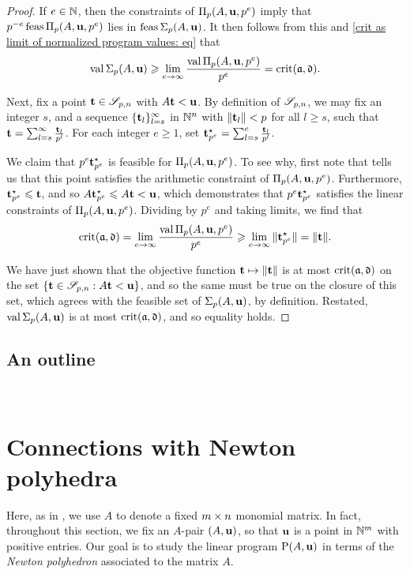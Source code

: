 \documentclass[11pt]{amsart}
\begin{document}
\begin{proof}
   If $e \in \mathbb{N}$, then the constraints of $\Pi_p(A, \mathbf{u}, p^e)$ imply that $p^{-e}  \operatorname{feas} \Pi_p(A, \mathbf{u}, p^e)$ lies in $\operatorname{feas} \Sigma_p(A,\mathbf{u})$.
   It then follows from this and \eqref{crit as limit of normalized program values: eq} that
   \[
      \operatorname{val}\Sigma_p(A,\mathbf{u}) \geqslant \displaystyle \lim_{e \to \infty}\frac{\operatorname{val}\Pi_p(A,\mathbf{u}, p^e)}{p^e} = \operatorname{crit}(\mathfrak{a}, \mathfrak{d}).
   \]

   Next, fix a point $\mathbf{t} \in \mathscr{S}_{p,n}$ with $A \mathbf{t} < \mathbf{u}$.
   By definition of $\mathscr{S}_{p,n}$, we may fix an integer $s$, and a sequence $\{ \mathbf{t}_l \}_{l=s}^\infty$ in $\mathbb{N}^n$ with $\| \mathbf{t}_l \| < p$ for all $l \geq s$, such that $\mathbf{t} = \sum_{l=s}^{\infty} \frac{\mathbf{t}_l}{p^l}$.
   For each integer $e \geq 1$, set $\mathbf{t}^\star_{p^e} = \sum_{l=s}^{e} \frac{\mathbf{t}_l}{p^l}$.

   We claim that $p^e  \mathbf{t}^\star_{p^e}$ is feasible for $\Pi_p(A, \mathbf{u}, p^e)$.
   To see why, first note that  tells us that this point satisfies the arithmetic constraint of $\Pi_p(A, \mathbf{u}, p^e)$.
   Furthermore, $\mathbf{t}^{\star}_{p^e} \leqslant \mathbf{t}$, and so $A \mathbf{t}^{\star}_{p^e} \leqslant A \mathbf{t} < \mathbf{u}$, which demonstrates that $p^e \mathbf{t}^\star_{p^e}$ satisfies the linear constraints of $\Pi_p(A, \mathbf{u}, p^e)$.
   Dividing by $p^e$ and taking limits, we find that
   \[
      \operatorname{crit}(\mathfrak{a}, \mathfrak{d}) = \lim_{e \to \infty} \frac{\operatorname{val} \Pi_p(A, \mathbf{u}, p^e)}{p^e} \geqslant \lim_{e \to \infty}   \| \mathbf{t}^\star_{p^e} \| = \| \mathbf{t} \|.
   \]

   We have just shown that the objective function $\mathbf{t} \mapsto \| \mathbf{t} \|$ is at most $\operatorname{crit}(\mathfrak{a}, \mathfrak{d})$ on the set $\{ \mathbf{t} \in \mathscr{S}_{p,n} : A \mathbf{t} < \mathbf{u} \}$, and so the same must be true on the closure of this set, which agrees with the feasible set of $\Sigma_p(A, \mathbf{u})$, by definition.
   Restated,  $ \operatorname{val} \Sigma_p(A, \mathbf{u})$ is at most $\operatorname{crit}(\mathfrak{a},  \mathfrak{d})$, and so equality holds.
\end{proof}

\subsection{An outline}

\ 

\newpage
\section{Connections with Newton polyhedra}
\label{s: newton}
Here, as in ,  we use $A$ to denote a fixed $m \times n$ monomial matrix.
In fact, throughout this section, we fix an $A$-pair $(A, \mathbf{u})$, so that $\mathbf{u}$ is a point in $\mathbb{N}^m$ with positive entries.
Our goal is to study the linear program $\mathrm{P}(A, \mathbf{u})$ in terms of the \emph{Newton polyhedron} associated to the matrix $A$.
\end{document}
